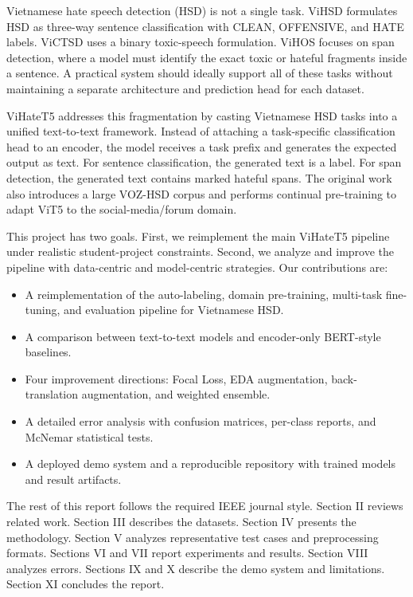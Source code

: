 \documentclass[journal]{IEEEtran}
\begin{document}
Vietnamese hate speech detection (HSD) is not a single task. ViHSD formulates HSD as three-way sentence classification with CLEAN, OFFENSIVE, and HATE labels. ViCTSD uses a binary toxic-speech formulation. ViHOS focuses on span detection, where a model must identify the exact toxic or hateful fragments inside a sentence. A practical system should ideally support all of these tasks without maintaining a separate architecture and prediction head for each dataset.

ViHateT5 \cite{vihatet5} addresses this fragmentation by casting Vietnamese HSD tasks into a unified text-to-text framework. Instead of attaching a task-specific classification head to an encoder, the model receives a task prefix and generates the expected output as text. For sentence classification, the generated text is a label. For span detection, the generated text contains marked hateful spans. The original work also introduces a large VOZ-HSD corpus and performs continual pre-training to adapt ViT5 \cite{vit5} to the social-media/forum domain.

This project has two goals. First, we reimplement the main ViHateT5 pipeline under realistic student-project constraints. Second, we analyze and improve the pipeline with data-centric and model-centric strategies. Our contributions are:
\begin{itemize}[leftmargin=*]
  \item A reimplementation of the auto-labeling, domain pre-training, multi-task fine-tuning, and evaluation pipeline for Vietnamese HSD.
  \item A comparison between text-to-text models and encoder-only BERT-style baselines.
  \item Four improvement directions: Focal Loss, EDA augmentation, back-translation augmentation, and weighted ensemble.
  \item A detailed error analysis with confusion matrices, per-class reports, and McNemar statistical tests.
  \item A deployed demo system and a reproducible repository with trained models and result artifacts.
\end{itemize}

The rest of this report follows the required IEEE journal style. Section II reviews related work. Section III describes the datasets. Section IV presents the methodology. Section V analyzes representative test cases and preprocessing formats. Sections VI and VII report experiments and results. Section VIII analyzes errors. Sections IX and X describe the demo system and limitations. Section XI concludes the report.
\end{document}
